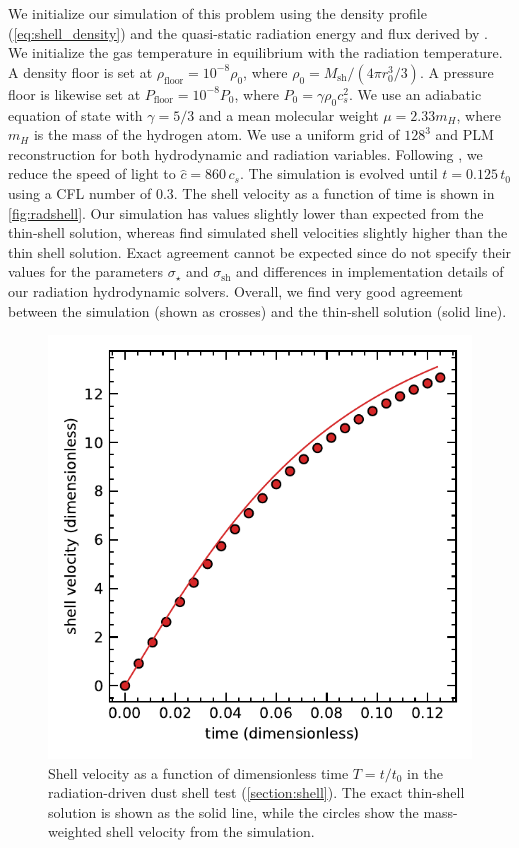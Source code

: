 \documentclass[fleqn,usenatbib]{mnras}
\begin{document}
We initialize our simulation of this problem using the density profile (\autoref{eq:shell_density}) and the quasi-static radiation energy and flux derived by . We initialize the gas temperature in equilibrium with the radiation temperature. A density floor is set at $\rho_{\text{floor}} = 10^{-8} \rho_0$, where $\rho_0 = M_{\text{sh}} / (4 \pi r_0^3 / 3)$. A pressure floor is likewise set at $P_{\text{floor}} = 10^{-8} P_0$, where $P_0 = \gamma \rho_0 c_s^2$. We use an adiabatic equation of state with $\gamma = 5/3$ and a mean molecular weight $\mu = 2.33 m_H$, where $m_H$ is the mass of the hydrogen atom. We use a uniform grid of $128^3$ and PLM reconstruction for both hydrodynamic and radiation variables. Following , we reduce the speed of light to $\hat c = 860 \, c_s$. The simulation is evolved until $t = 0.125 \, t_0$ using a CFL number of $0.3$. The shell velocity as a function of time is shown in \autoref{fig:radshell}. Our simulation has values slightly lower than expected from the thin-shell solution, whereas  find simulated shell velocities slightly higher than the thin shell solution. Exact agreement cannot be expected since  do not specify their values for the parameters $\sigma_{\star}$ and $\sigma_{\text{sh}}$ and differences in implementation details of our radiation hydrodynamic solvers. Overall, we find very good agreement between the simulation (shown as crosses) and the thin-shell solution (solid line). 

\begin{figure}
    \includegraphics[width=\columnwidth]{shell_velocity.pdf}
    \caption{Shell velocity as a function of dimensionless time $T = t/t_0$ in the radiation-driven dust shell test (\autoref{section:shell}). The exact thin-shell solution is shown as the solid line, while the circles show the mass-weighted shell velocity from the simulation.}
    \label{fig:radshell}
\end{figure}
\end{document}
